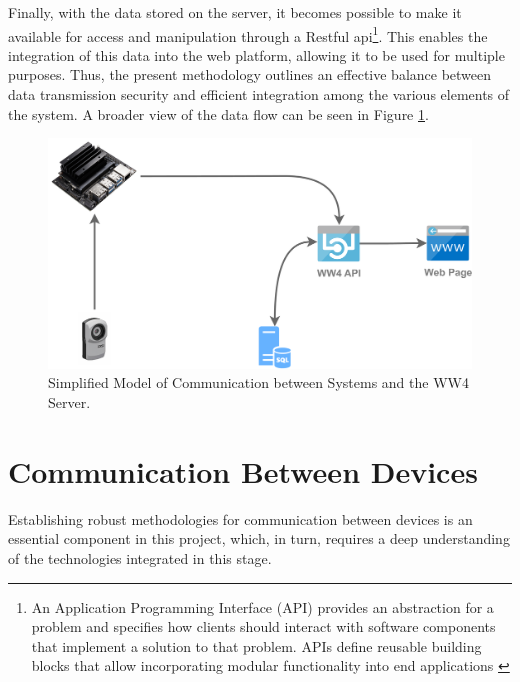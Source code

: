 Finally, with the data stored on the server, it becomes possible to make it available for access and manipulation through a Restful \acrfull{api}\footnote{An Application Programming Interface (API) provides an abstraction for a problem and specifies how clients should interact with software components that implement a solution to that problem. APIs define reusable building blocks that allow incorporating modular functionality into end applications \cite{reddy2011api}}. This enables the integration of this data into the web platform, allowing it to be used for multiple purposes. Thus, the present methodology outlines an effective balance between data transmission security and efficient integration among the various elements of the system. A broader view of the data flow can be seen in Figure \ref{fig:simpleModelOfTheDataProcess}.

\begin{figure}[h!]
    \centering
    \includegraphics[width=.65\linewidth]{images/Development/chap3/LeftOver.pdf}
    \caption{Simplified Model of Communication between  Systems and the WW4 Server.}
    \label{fig:simpleModelOfTheDataProcess}
\end{figure}

\section{Communication Between Devices}\label{section:comunication}

Establishing robust methodologies for communication between devices is an essential component in this project, which, in turn, requires a deep understanding of the technologies integrated in this stage.

